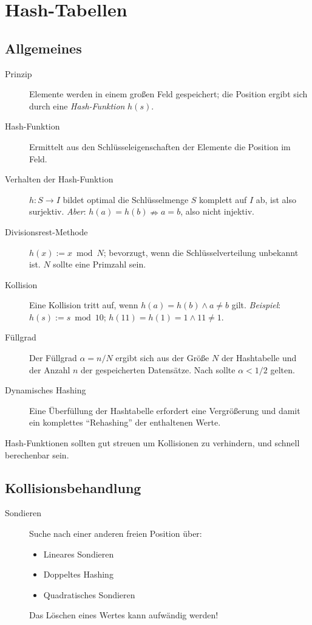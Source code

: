 \section{Hash-Tabellen}
\subsection{Allgemeines}
\begin{description}
  \item[Prinzip] Elemente werden in einem großen Feld gespeichert; die Position ergibt sich durch eine \emph{Hash-Funktion} $h(s)$.
  \item[Hash-Funktion] Ermittelt aus den Schlüsseleigenschaften der Elemente die Position im Feld.
  \item[Verhalten der Hash-Funktion] $h : S \to I$ bildet optimal die Schlüsselmenge $S$ komplett auf $I$ ab, ist also surjektiv.
                                     \emph{Aber}: $h(a) = h(b) \nRightarrow a = b$, also nicht injektiv.
  \item[Divisionsrest-Methode] $h(x) := x \bmod N$; bevorzugt, wenn die Schlüsselverteilung unbekannt ist.
                               $N$ sollte eine Primzahl sein.
  \item[Kollision] Eine Kollision tritt auf, wenn $h(a) = h(b) \land a \neq b$ gilt.
                   \emph{Beispiel}: $h(s) := s \bmod 10$; $h(11) = h(1) = 1 \land 11 \neq 1$.
  \item[Füllgrad] Der Füllgrad $\alpha = n/N$ ergibt sich aus der Größe $N$ der Hashtabelle und der Anzahl $n$ der gespeicherten Datensätze.
                  Nach  sollte $\alpha < 1/2$ gelten.
  \item[Dynamisches Hashing] Eine Überfüllung der Hashtabelle erfordert eine Vergrößerung und damit ein komplettes \enquote{Rehashing} der enthaltenen Werte.
\end{description}
Hash-Funktionen sollten gut streuen um Kollisionen zu verhindern, und schnell berechenbar sein.

\subsection{Kollisionsbehandlung}
\begin{description}
  \item[Sondieren] Suche nach einer anderen freien Position über:
  \begin{itemize}
    \item Lineares Sondieren
    \item Doppeltes Hashing
    \item Quadratisches Sondieren
  \end{itemize}
  Das Löschen eines Wertes kann aufwändig werden!
\end{description}

